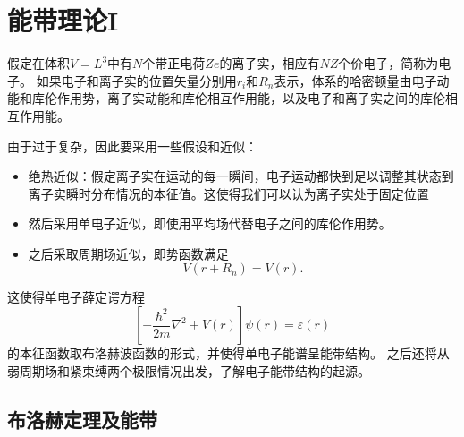 \chapter{能带理论I}\label{chapter:能带理论I}
    假定在体积$V=L^3$中有$N$个带正电荷$Ze$的离子实，相应有$NZ$个价电子，简称为电子。
    如果电子和离子实的位置矢量分别用$r_i$和$R_n$表示，体系的哈密顿量由电子动能和库伦作用势，离子实动能和库伦相互作用能，以及电子和离子实之间的库伦相互作用能。

    由于过于复杂，因此要采用一些假设和近似：
    \begin{itemize}
        \item {绝热近似}：假定离子实在运动的每一瞬间，电子运动都快到足以调整其状态到离子实瞬时分布情况的本征值。这使得我们可以认为离子实处于固定位置
        \item 然后采用单电子近似，即使用平均场代替电子之间的库伦作用势。
        \item  之后采取周期场近似，即势函数满足
        \begin{equation}
            V(r+R_n)=V(r).
        \end{equation}
    \end{itemize}
    这使得单电子薛定谔方程
    \begin{equation}
        \left[-\frac{\hbar^2}{2m}\nabla^2+V(r)\right]\psi(r)=\varepsilon(r)
    \end{equation}
    的本征函数取布洛赫波函数的形式，并使得单电子能谱呈能带结构。
    之后还将从弱周期场和紧束缚两个极限情况出发，了解电子能带结构的起源。
    
    

    \section{布洛赫定理及能带}\label{section:布洛赫定理及能带}
